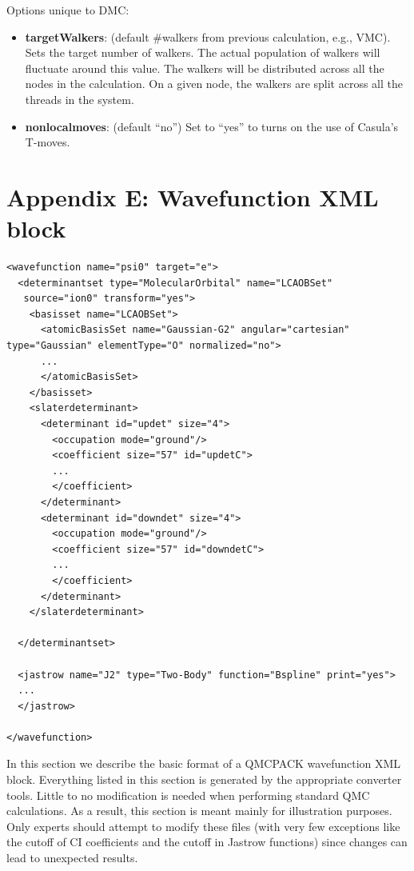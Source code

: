 Options unique to DMC:
\begin{itemize}
\item{\textbf{targetWalkers}: (default \#walkers from previous calculation, e.g., VMC). Sets the
target number of walkers. The actual population of walkers will fluctuate around this
value. The walkers will be distributed across all the nodes in the calculation. On a
given node, the walkers are split across all the threads in the system.}
\item{\textbf{nonlocalmoves}: (default ``no”) Set to ``yes” to turns on the use of Casula’s T-moves.}
\end{itemize}


\newpage
\section{Appendix E: Wavefunction XML block}

\begin{lstlisting}[style=QMCPXML,caption=``Basic framework for a single-determinant determinantset XML block.",label=lst:lam_xml_determinantset]
<wavefunction name="psi0" target="e">
  <determinantset type="MolecularOrbital" name="LCAOBSet"
   source="ion0" transform="yes">
    <basisset name="LCAOBSet">
      <atomicBasisSet name="Gaussian-G2" angular="cartesian" type="Gaussian" elementType="O" normalized="no">
      ...
      </atomicBasisSet>
    </basisset>
    <slaterdeterminant>
      <determinant id="updet" size="4">
        <occupation mode="ground"/>
        <coefficient size="57" id="updetC">
        ...
        </coefficient>
      </determinant>
      <determinant id="downdet" size="4">
        <occupation mode="ground"/>
        <coefficient size="57" id="downdetC">
        ...
        </coefficient>
      </determinant>
    </slaterdeterminant>

  </determinantset>

  <jastrow name="J2" type="Two-Body" function="Bspline" print="yes">
  ...
  </jastrow>

</wavefunction>
\end{lstlisting}

In this section we describe the basic format of a QMCPACK wavefunction XML block.
Everything listed in this section is generated by the appropriate converter tools. Little to
no modification is needed when performing standard QMC calculations. As a result, this
section is meant mainly for illustration purposes. Only experts should attempt to modify
these files (with very few exceptions like the cutoff of CI coefficients and the cutoff in Jastrow
functions) since changes can lead to unexpected results.

